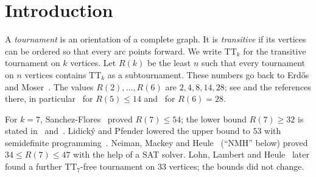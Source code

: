 \documentclass[11pt]{amsart}
\theoremstyle{definition}
\theoremstyle{remark}
\newcommand{\TT}[1]{\mathrm{TT}_{#1}}
\begin{document}
\section{Introduction}\label{sec:intro}

A \emph{tournament} is an orientation of a complete graph. It is
\emph{transitive} if its vertices can be ordered so that every arc points
forward. We write $\TT{k}$ for the transitive tournament on $k$ vertices. Let
$R(k)$ be the least $n$ such that every tournament on $n$ vertices contains
$\TT{k}$ as a subtournament. These numbers go back to Erd\H{o}s and
Moser~\cite{EM64}. The values $R(2),\dots,R(6)$ are $2,4,8,14,28$; see
\cite[\S2]{NMH22} and the references there, in particular~\cite{RP70} for
$R(5) \le 14$ and~\cite{SF94} for $R(6)=28$.

For $k=7$, Sanchez-Flores~\cite{SF98} proved $R(7) \le 54$; the lower bound
$R(7) \ge 32$ is stated in~\cite{LP21} and~\cite[\S2]{NMH22}.
Lidick\'y and Pfender lowered the upper bound to $53$ with semidefinite
programming~\cite{LP21}. Neiman, Mackey and Heule~\cite{NMH22} (``NMH'' below)
proved $34 \le R(7) \le 47$ with the help of a SAT solver. Lohn, Lambert and
Heule~\cite{LLH22} later found a further $\TT{7}$-free tournament on
$33$ vertices; the bounds did not change.
\end{document}
